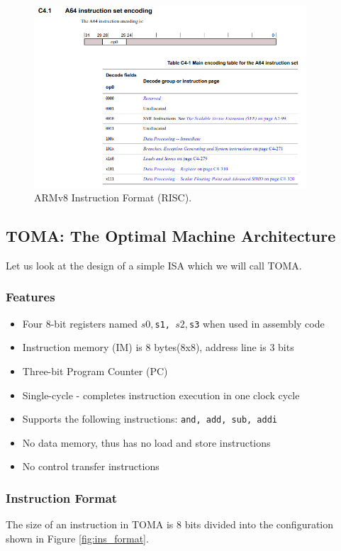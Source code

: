 \documentclass[a4paper, 11pt,oneside]{article}
\begin{document}
\begin{figure}[H]
	\begin{center}
	\includegraphics[width=4in]{armv8.png}
	\caption{ARMv8 Instruction Format (RISC).}
	\label{fig:armv8} 
	\end{center}
\end{figure}

\subsection{TOMA: The Optimal Machine Architecture}
Let us look at the design of a simple ISA which we will call TOMA.

\subsubsection{Features}
\begin{itemize}
\item Four 8-bit registers named \texttt{$s0, $s1, $s2, $s3} when 
used in assembly code
\item Instruction memory (IM) is 8 bytes(8x8), address line is 3 bits
\item Three-bit Program Counter (PC)
\item Single-cycle - completes instruction execution in one clock cycle
\item Supports the following instructions: \texttt{and, add, sub, 
addi}
\item No data memory, thus has no load and store instructions
\item No control transfer instructions
\end{itemize}

\subsubsection{Instruction Format}
The size of an instruction in TOMA is 8 bits divided into the configuration 
shown in Figure \ref{fig:ins_format}.
\end{document}

